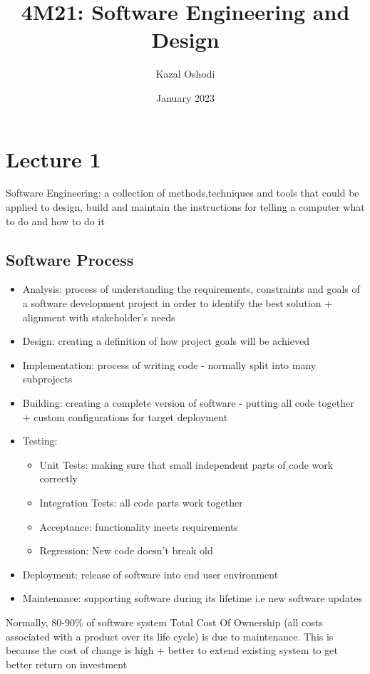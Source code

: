 \documentclass{article}
\title{4M21: Software Engineering and Design}
\author{Kazal Oshodi }
\date{January 2023}
\begin{document}
\maketitle
\tableofcontents

\section{Lecture 1}
Software Engineering: a collection of methods,techniques and tools that could be applied to design, build and maintain the instructions for telling a computer what to do and how to do it
\subsection{Software Process}
\begin{itemize}
    \item Analysis: process of understanding the requirements, constraints and goals of a software development project in order to identify the best solution + alignment with stakeholder's needs
    \item Design: creating a definition of how project goals will be achieved
    \item Implementation: process of writing code - normally split into many subprojects
    \item Building: creating a complete version of software - putting all code together + custom configurations for target deployment
    \item Testing: 
    \begin{itemize} 
    \item Unit Tests: making sure that small independent parts of code work correctly 
    \item Integration Tests: all code parts work together
    \item Acceptance: functionality meets requirements
    \item Regression: New code doesn't break old
    \end{itemize}
    \item Deployment: release of software into end user environment
    \item Maintenance: supporting software during its lifetime i.e new software updates
\end{itemize}
Normally, 80-90\% of software system Total Cost Of Ownership (all costs associated with a product over its life cycle) is due to maintenance. This is because the cost of change is high + better to extend existing system to get better return on investment
\end{document}

